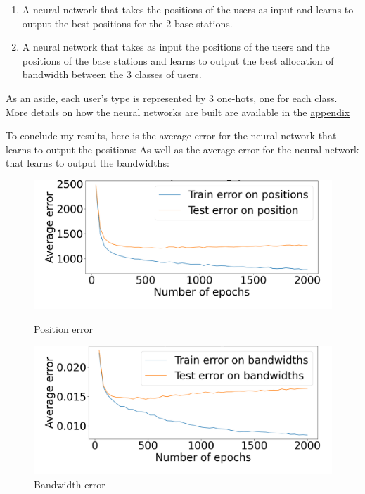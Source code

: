 \documentclass[letterpaper]{article}
\begin{document}
\begin{enumerate}
    \item A neural network that takes the positions of the users as input and learns to output the best positions for the 2 base stations.
    \item A neural network that takes as input the positions of the users and the positions of the base stations and learns to output the best allocation of bandwidth between the 3 classes of users.
\end{enumerate}

As an aside, each user's type is represented by 3 one-hots, one for each class.
More details on how the neural networks are built are available in the \hyperref[appendix]{appendix}

To conclude my results, here is the average error for the neural network that learns to output the positions:
As well as the average error for the neural network that learns to output the bandwidths:

\begin{figure}[H]
    \centering
    \begin{minipage}[b]{0.45\textwidth}
        \centering
        \includegraphics[width=\textwidth]{images/mix_pos.png}
        \caption{Position error}
        \label{fig:image5}
    \end{minipage}
    \hspace{0.05\textwidth}
    \begin{minipage}[b]{0.45\textwidth}
        \centering
        \includegraphics[width=\textwidth]{images/bw_error_epochs.png}
        \caption{Bandwidth error}
        \label{fig:image6}
    \end{minipage}
\end{figure}
\end{document}
